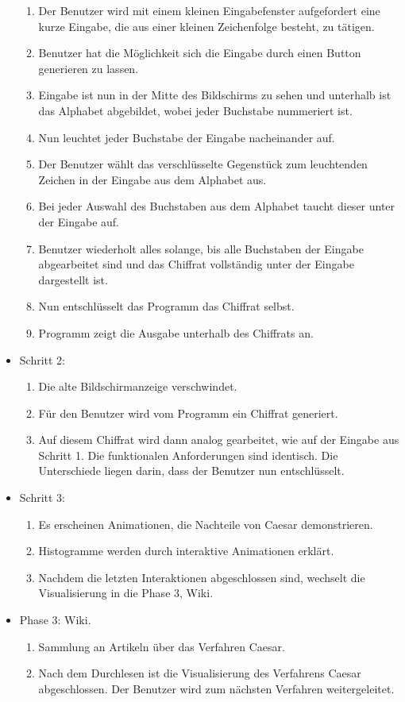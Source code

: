 \documentclass{article}
\begin{document}
\begin{itemize}[label={}]
	\begin{enumerate}
	 \item Der Benutzer wird mit einem kleinen Eingabefenster aufgefordert eine kurze Eingabe, die aus einer kleinen Zeichenfolge besteht, zu tätigen.
	 \item Benutzer hat die Möglichkeit sich die Eingabe durch einen Button generieren zu lassen.
	 \item Eingabe ist nun in der Mitte des Bildschirms zu sehen und unterhalb ist das Alphabet abgebildet, wobei jeder Buchstabe nummeriert ist.     
	 \item Nun leuchtet jeder Buchstabe der Eingabe nacheinander auf.
	 \item Der Benutzer wählt das verschlüsselte Gegenstück zum leuchtenden Zeichen in der Eingabe aus dem Alphabet aus. 
	 \item Bei jeder Auswahl des Buchstaben aus dem Alphabet taucht dieser unter der Eingabe auf.
	 \item[] Benutzer wiederholt alles solange, bis alle Buchstaben der Eingabe abgearbeitet sind und das Chiffrat vollständig unter der Eingabe dargestellt ist.
	 \item Nun entschlüsselt das Programm das Chiffrat selbst.
	 \item Programm zeigt die Ausgabe unterhalb des Chiffrats an.
	\end{enumerate}

 \item Schritt 2:

	\begin{enumerate}
	 \item Die alte Bildschirmanzeige verschwindet.
	 \item Für den Benutzer wird vom Programm ein Chiffrat generiert. 
	 \item[] Auf diesem Chiffrat wird dann analog gearbeitet, wie auf der Eingabe aus Schritt 1. Die funktionalen Anforderungen sind identisch. Die Unterschiede liegen darin, dass der Benutzer nun entschlüsselt.
	\end{enumerate}

 \item Schritt 3:
	\begin{enumerate}
	 \item Es erscheinen Animationen, die Nachteile von Caesar demonstrieren.
	 \item Histogramme werden durch interaktive Animationen erklärt.
	 \item Nachdem die letzten Interaktionen abgeschlossen sind, wechselt die Visualisierung in die Phase 3, Wiki.
	\end{enumerate}

 \item Phase 3: Wiki.

	\begin{enumerate}
	 \item Sammlung an Artikeln über das Verfahren Caesar.
	 \item Nach dem Durchlesen ist die Visualisierung des Verfahrens Caesar abgeschlossen. Der Benutzer wird zum nächsten Verfahren weitergeleitet.
 	\end{enumerate}

\end{itemize}
\end{document}
